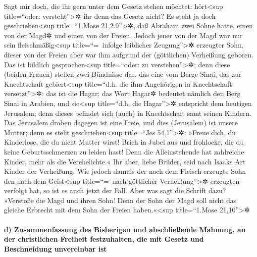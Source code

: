  Sagt mir doch, die ihr gern unter dem Gesetz stehen
möchtet: hört\textless sup title=``oder: versteht''\textgreater✲ ihr
denn das Gesetz nicht?  Es steht ja doch
geschrieben\textless sup title=``1.Mose 21,2.9''\textgreater✲, daß
Abraham zwei Söhne hatte, einen von der Magd✲ und einen von der Freien.
 Jedoch jener von der Magd war nur sein
fleischmäßig\textless sup title=``=~infolge leiblicher
Zeugung''\textgreater✲ erzeugter Sohn, dieser von der Freien aber war
ihm aufgrund der (göttlichen) Verheißung geboren.  Das
ist bildlich gesprochen\textless sup title=``oder: zu
verstehen''\textgreater✲; denn diese (beiden Frauen) stellen zwei
Bündnisse dar, das eine vom Berge Sinai, das zur Knechtschaft
gebiert\textless sup title=``d.h. die ihm Angehörigen in Knechtschaft
versetzt''\textgreater✲: das ist die Hagar;  das Wort
Hagar✲ bedeutet nämlich den Berg Sinai in Arabien, und sie\textless sup
title=``d.h. die Hagar''\textgreater✲ entspricht dem heutigen Jerusalem;
denn dieses befindet sich (auch) in Knechtschaft samt seinen Kindern.
 Das Jerusalem droben dagegen ist eine Freie, und dies
(Jerusalem) ist unsere Mutter;  denn es steht
geschrieben\textless sup title=``Jes 54,1''\textgreater✲: »Freue dich,
du Kinderlose, die du nicht Mutter wirst! Brich in Jubel aus und
frohlocke, die du keine Geburtsschmerzen zu leiden hast! Denn die
Alleinstehende hat zahlreiche Kinder, mehr als die Verehelichte.«
 Ihr aber, liebe Brüder, seid nach Isaaks Art Kinder der
Verheißung.  Wie jedoch damals der nach dem Fleisch
erzeugte Sohn den nach dem Geist\textless sup title=``=~nach göttlicher
Verheißung''\textgreater✲ erzeugten verfolgt hat, so ist es auch jetzt
der Fall.  Aber was sagt die Schrift dazu? »Verstoße die
Magd und ihren Sohn! Denn der Sohn der Magd soll nicht das gleiche
Erbrecht mit dem Sohn der Freien haben.«\textless sup title=``1.Mose
21,10''\textgreater✲

\hypertarget{d-zusammenfassung-des-bisherigen-und-abschlieuxdfende-mahnung-an-der-christlichen-freiheit-festzuhalten-die-mit-gesetz-und-beschneidung-unvereinbar-ist}{%
\paragraph{d) Zusammenfassung des Bisherigen und abschließende Mahnung,
an der christlichen Freiheit festzuhalten, die mit Gesetz und
Beschneidung unvereinbar
ist}\label{d-zusammenfassung-des-bisherigen-und-abschlieuxdfende-mahnung-an-der-christlichen-freiheit-festzuhalten-die-mit-gesetz-und-beschneidung-unvereinbar-ist}}

